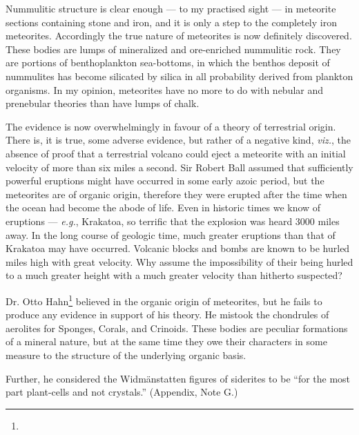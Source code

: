 \documentclass[a4paper, 12pt, oneside]{article}
\begin{document}
Nummulitic structure is clear enough --- to my practised sight --- in meteorite sections containing stone and iron, and it is only a step to the completely iron meteorites. Accordingly the true nature of meteorites is now definitely discovered. These bodies are lumps of mineralized and ore-enriched nummulitic rock. They are portions of benthoplankton sea-bottoms, in which the benthos deposit of nummulites has become silicated by silica in all probability derived from plankton organisms. In my opinion, meteorites have no more to do with nebular and prenebular theories than have lumps of chalk.

The evidence is now overwhelmingly in favour of a theory of terrestrial origin. There is, it is true, some adverse evidence, but rather of a negative kind, \emph{viz.}, the absence of proof that a terrestrial volcano could eject a meteorite with an initial velocity of more than six miles a second. Sir Robert Ball assumed that sufficiently powerful eruptions might have occurred in some early azoic period, but the meteorites are of organic origin, therefore they were erupted after the time when the ocean had become the abode of life. Even in historic times we know of eruptions --- \emph{e.g.}, Krakatoa, so terrific that the explosion was heard 3000 miles away. In the long course of geologic time, much greater eruptions than that of Krakatoa may have occurred. Volcanic blocks and bombs are known to be hurled miles high with great velocity. Why assume the impossibility of their being hurled to a much greater height with a much greater velocity than hitherto suspected?

Dr. Otto Hahn\footnote{} believed in the organic origin of meteorites, but he fails to produce any evidence in support of his theory. He mistook the chondrules of aerolites for Sponges, Corals, and Crinoids. These bodies are peculiar formations of a mineral nature, but at the same time they owe their characters in some measure to the structure of the underlying organic basis.

Further, he considered the Widmänstatten figures of siderites to be ``for the most part plant-cells and not crystals.'' (Appendix, Note G.)
\end{document}
